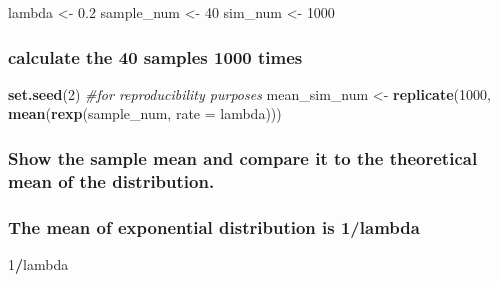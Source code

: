 \documentclass[
]{article}
\newenvironment{Shaded}{\begin{snugshade}}{\end{snugshade}}
\newcommand{\CommentTok}[1]{\textcolor[rgb]{0.56,0.35,0.01}{\textit{#1}}}
\newcommand{\DataTypeTok}[1]{\textcolor[rgb]{0.13,0.29,0.53}{#1}}
\newcommand{\DecValTok}[1]{\textcolor[rgb]{0.00,0.00,0.81}{#1}}
\newcommand{\FloatTok}[1]{\textcolor[rgb]{0.00,0.00,0.81}{#1}}
\newcommand{\KeywordTok}[1]{\textcolor[rgb]{0.13,0.29,0.53}{\textbf{#1}}}
\newcommand{\NormalTok}[1]{#1}
\newcommand{\OperatorTok}[1]{\textcolor[rgb]{0.81,0.36,0.00}{\textbf{#1}}}
\newcommand{\StringTok}[1]{\textcolor[rgb]{0.31,0.60,0.02}{#1}}
\begin{document}
\begin{Shaded}
\begin{Highlighting}[]
\NormalTok{lambda \textless{}{-}}\StringTok{ }\FloatTok{0.2}
\NormalTok{sample\_num \textless{}{-}}\StringTok{ }\DecValTok{40}
\NormalTok{sim\_num \textless{}{-}}\StringTok{ }\DecValTok{1000}
\end{Highlighting}
\end{Shaded}

\hypertarget{calculate-the-40-samples-1000-times}{%
\subsubsection{calculate the 40 samples 1000
times}\label{calculate-the-40-samples-1000-times}}

\begin{Shaded}
\begin{Highlighting}[]
\KeywordTok{set.seed}\NormalTok{(}\DecValTok{2}\NormalTok{) }\CommentTok{\#for reproducibility purposes}
\NormalTok{mean\_sim\_num \textless{}{-}}\StringTok{ }\KeywordTok{replicate}\NormalTok{(}\DecValTok{1000}\NormalTok{, }\KeywordTok{mean}\NormalTok{(}\KeywordTok{rexp}\NormalTok{(sample\_num, }\DataTypeTok{rate =}\NormalTok{ lambda)))}
\end{Highlighting}
\end{Shaded}

\hypertarget{show-the-sample-mean-and-compare-it-to-the-theoretical-mean-of-the-distribution.}{%
\subsubsection{Show the sample mean and compare it to the theoretical
mean of the
distribution.}\label{show-the-sample-mean-and-compare-it-to-the-theoretical-mean-of-the-distribution.}}

\hypertarget{the-mean-of-exponential-distribution-is-1lambda}{%
\subsubsection{The mean of exponential distribution is
1/lambda}\label{the-mean-of-exponential-distribution-is-1lambda}}

\begin{Shaded}
\begin{Highlighting}[]
\DecValTok{1}\OperatorTok{/}\NormalTok{lambda}
\end{Highlighting}
\end{Shaded}
\end{document}
